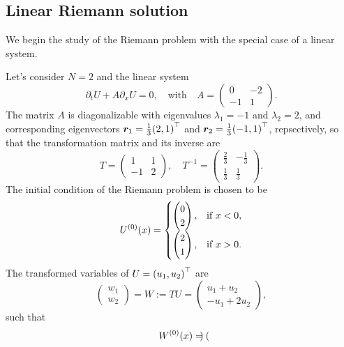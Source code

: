 \subsection{Linear Riemann solution}

We begin the study of the Riemann problem with the special case of a linear system.

\begin{example}
	Let's consider \(N = 2\) and the linear system
	\[
		\partial_t U + A\partial_x U = 0, \quad \text{with} \quad A = \begin{pmatrix}
			0 & -2\\
			-1 & 1
		\end{pmatrix}.
	\]
	The matrix \(A\) is diagonalizable with eigenvalues \(\lambda_1 = -1\) and \(\lambda_2 = 2\), and corresponding eigenvectors \(\bm{r}_1 = \frac{1}{3}\parentheses*{2, 1}^\top\) and \(\bm{r}_2 = \frac{1}{3}\parentheses*{-1, 1}^\top\), repsectively, so that the transformation matrix and its inverse are
	\[
		T = \begin{pmatrix}
			1 & 1\\
			-1 & 2
		\end{pmatrix}, \quad T^{-1} = \begin{pmatrix}
			\frac{2}{3} & -\frac{1}{3}\\
			\frac{1}{3} & \frac{1}{3}
		\end{pmatrix}.
	\]
	The initial condition of the Riemann problem is chosen to be
	\[
		U^{\parentheses*{0}}\parentheses*{x} = \begin{cases}
			\begin{pmatrix}
				0\\
				2
			\end{pmatrix}, & \text{if }x < 0,\\
			\begin{pmatrix}
				2\\
				1
			\end{pmatrix}, & \text{if }x > 0.
		\end{cases}
	\]
	The transformed variables of \(U = \parentheses*{u_1, u_2}^\top\) are
	\[
		\begin{pmatrix}
			w_1\\
			w_2
		\end{pmatrix} = W := TU = \begin{pmatrix}
			u_1 + u_2\\
			-u_1 + 2u_2
		\end{pmatrix},
	\]
	such that
	\[
		W^{\parentheses*{0}}\parentheses*{x} = \begin{pmatrix}

\end{pmatrix}\]
\end{example}

